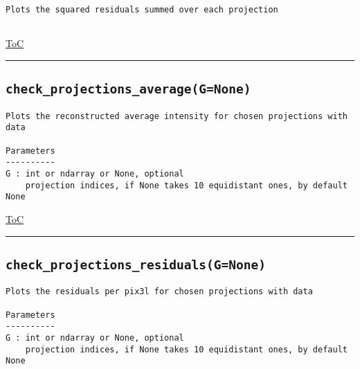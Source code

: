 \documentclass{article}
\begin{document}
\begin{lstlisting}[language=docstring]
Plots the squared residuals summed over each projection
    
\end{lstlisting}

\begin{flushright}

\hyperref[toc]{ToC}

\end{flushright}



\vspace{5mm}

\hrule

\subsection*{\texttt{check\_projections\_average(G=None)}}

\begin{lstlisting}[language=docstring]
Plots the reconstructed average intensity for chosen projections with data

Parameters
----------
G : int or ndarray or None, optional
    projection indices, if None takes 10 equidistant ones, by default None
\end{lstlisting}

\begin{flushright}

\hyperref[toc]{ToC}

\end{flushright}



\vspace{5mm}

\hrule

\subsection*{\texttt{check\_projections\_residuals(G=None)}}

\begin{lstlisting}[language=docstring]
Plots the residuals per pix3l for chosen projections with data

Parameters
----------
G : int or ndarray or None, optional
    projection indices, if None takes 10 equidistant ones, by default None
\end{lstlisting}
\end{document}
